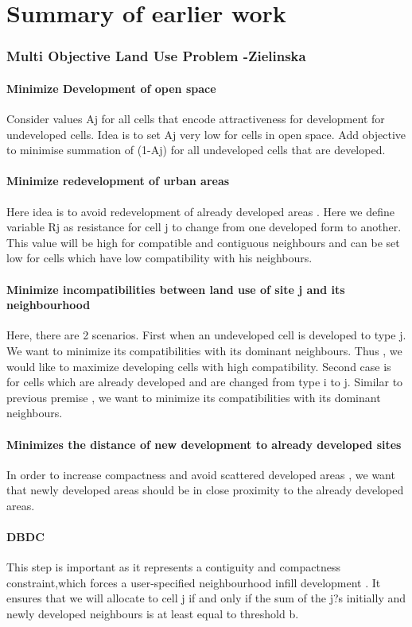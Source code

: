 \documentclass{sig-alternate}
\begin{document}
 \appendix
\section{Summary of earlier work}

\subsubsection{Multi Objective Land Use Problem -Zielinska}

\paragraph*{Minimize Development of open space} Consider values Aj  for all cells that encode attractiveness for development for undeveloped cells. Idea is to set Aj very low for cells in open space. Add objective to minimise summation of (1-Aj) for all undeveloped cells that are developed. 
\paragraph*{Minimize redevelopment of urban areas}  Here idea is to avoid redevelopment of already developed areas . Here we define variable Rj as resistance for cell j to change from one developed form to another. This value will be high for compatible and contiguous neighbours and can be set low for cells which have low compatibility with his neighbours.
\paragraph*{Minimize incompatibilities between land use of site j and its neighbourhood } Here, there are 2 scenarios. First when an undeveloped cell is developed to type j. We want to minimize its compatibilities with its dominant neighbours. Thus , we would like to maximize developing cells with high compatibility. Second case is for  cells which are already developed and are changed from type i to j. Similar to previous premise , we want  to minimize its compatibilities with its dominant neighbours. 
\paragraph*{Minimizes the distance of new development to already developed sites } In order to increase compactness and avoid scattered developed areas , we want that newly developed areas should be in close proximity to the already developed areas.
\paragraph*{DBDC}
This step is important as it represents a contiguity and compactness constraint,which forces a user-specified neighbourhood infill development . It ensures that we will allocate to cell j if and only if the sum of the j?s initially and newly developed neighbours is at least equal to threshold b.\\[.25cm]
\end{document}
